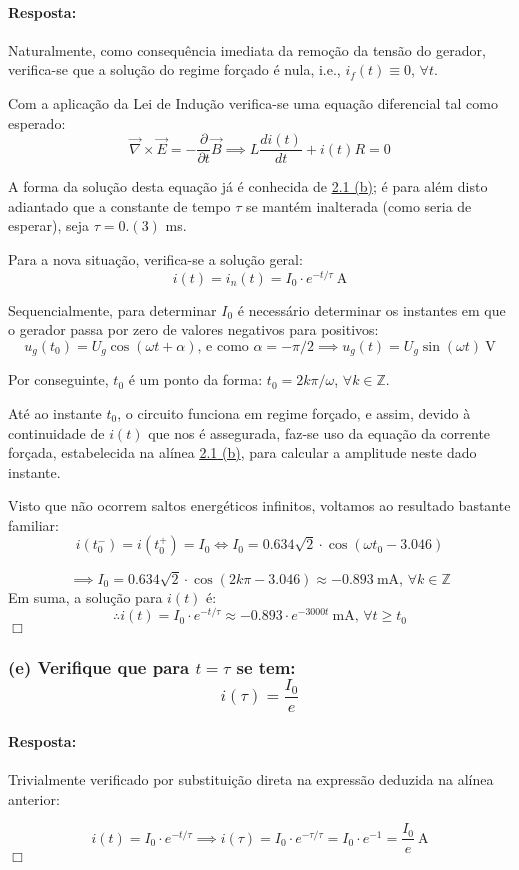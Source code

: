 \paragraph{Resposta:}
Naturalmente, como consequência imediata da remoção da tensão do gerador, verifica-se que a solução do regime forçado é nula, i.e., $i_f(t) \equiv 0$, $\forall t$.

Com a aplicação da Lei de Indução verifica-se uma equação diferencial  tal como esperado:
$$
    \overrightarrow{\nabla} \times \overrightarrow{E} = -\dfrac{\partial}{\partial t}\overrightarrow{B} \implies L \dfrac{di(t)}{dt} + i(t)R = 0
$$

A forma da solução desta equação já é conhecida de \hyperref[subsubsec_b]{\underline{2.1} (b)}; é para além disto adiantado que a constante de tempo $\tau$ se mantém inalterada (como seria de esperar), seja $\tau = 0.(3)$ ms.

Para a nova situação, verifica-se a solução geral:
$$
    i(t) = i_n(t) = I_0\cdot e^{-t/\tau}\ \text{A}
$$

Sequencialmente, para determinar $I_0$ é necessário determinar os instantes em que o gerador passa por zero de valores negativos para positivos:
$$
    u_g(t_0) = U_g \cos{(\omega t + \alpha)}\text{, e como $\alpha = -\pi/2$} \implies u_g(t) = U_g \sin{(\omega t)}\ \text{V}
$$

Por conseguinte, $t_0$ é um ponto da forma: $t_0 = 2k\pi/\omega$, $\forall k \in \mathbb{Z}$. 


Até ao instante $t_0$, o circuito funciona em regime forçado, e assim, devido à continuidade de $i(t)$ que nos é assegurada, faz-se uso da equação da corrente forçada, estabelecida na alínea \hyperref[subsubsec_b]{\underline{2.1} (b)}, para calcular a amplitude neste dado instante.

Visto que não ocorrem saltos energéticos infinitos, voltamos ao resultado bastante familiar:
$$
    i(t_0^-) = i(t_0^+) = I_0 \iff I_0 = 0.634 \sqrt{2}\cdot \cos{(\omega t_0 - 3.046)}
$$

$$
    \implies I_0 = 0.634 \sqrt{2}\cdot \cos{(2k\pi-3.046)} \approx -0.893\ \text{mA, }\forall k \in \mathbb{Z}
$$
Em suma, a solução para $i(t)$ é: 
$$
    \therefore i(t) = I_0\cdot e^{-t/\tau} \approx -0.893\cdot e^{-3000t}\ \text{mA}\text{, }\forall t \ge t_0
$$
\hfill \ensuremath{\Box}
\subsubsection*{(e) Verifique que para $t = \tau$ se tem: \\ $$i(\tau) = \dfrac{I_0}{e}$$}
\label{subsubsec_e}
\paragraph{Resposta:} Trivialmente verificado por substituição direta na expressão deduzida na alínea anterior:

$$
    i(t) = I_0\cdot e^{-t/\tau} \implies i(\tau) = I_0\cdot e^{-\tau/\tau} = I_0\cdot e^{-1} = \frac{I_0}{e}\ \text{A}
$$
\hfill \ensuremath{\Box}
